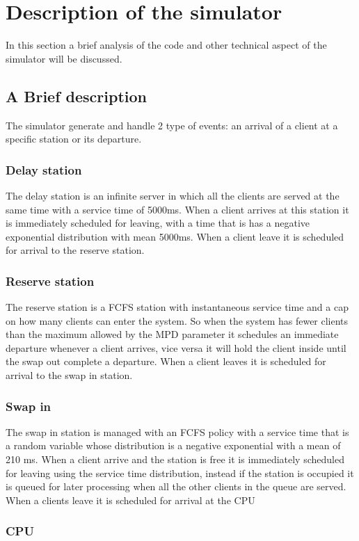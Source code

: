 \documentclass[12pt,a4paper]{article}
\begin{document}
\section{Description of the simulator}
In this section a brief analysis of the code and other technical aspect of the simulator will be discussed.
\subsection{A Brief description}
The simulator generate and handle 2 type of events: an arrival of a client at a specific station or its departure.
\subsubsection{Delay station}
The delay station is an infinite server in which all the clients are served at the same time with a service time of 5000ms. When a client arrives at this station it is immediately scheduled for leaving, with a time that is has a negative exponential distribution with mean 5000ms. When a client leave it is scheduled for arrival to the reserve station.
\\
\subsubsection{Reserve station}
The reserve station is a FCFS station with instantaneous service time and a cap on how many clients can enter the system. So when the system has fewer clients than the maximum allowed by the MPD parameter it schedules an immediate departure whenever a client arrives, vice versa it will hold the client inside until the swap out complete a departure. When a client leaves it is scheduled for arrival to the swap in station.

\subsubsection{Swap in}
The swap in station is managed with an FCFS policy with a service time that is a random variable whose distribution is a negative exponential with a mean of 210 ms. When a client arrive and the station is free it is immediately scheduled for leaving using the service time distribution, instead if the station is occupied it is queued for later processing when all the other clients in the queue are served. When a clients leave it is scheduled for arrival at the CPU

\subsubsection{CPU}
\end{document}
